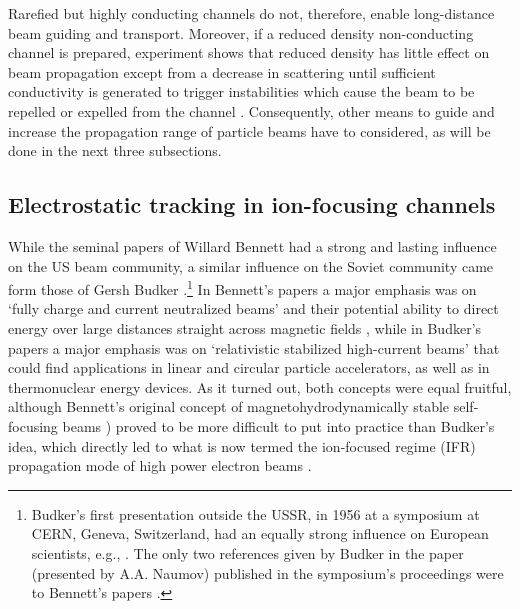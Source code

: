 \documentclass [12pt,a4paper,     ]{report} %
\begin{document}
   Rarefied but highly conducting channels do not, therefore, enable long-distance beam guiding and transport.  Moreover, if a reduced density non-conducting channel is prepared, experiment shows that reduced density has little effect on beam propagation except from a decrease in scattering until sufficient conductivity is generated to trigger instabilities which cause the beam to be repelled or expelled from the channel \cite{MURPH1987-}.  Consequently, other means to guide and increase the propagation range of particle beams have to considered, as will be done in the next three subsections.


\subsection{Electrostatic tracking in ion-focusing channels}

  While the seminal papers of Willard Bennett \cite{BENNE1934-,BENNE1955-} had a strong and lasting influence on the US beam community, a similar influence on the Soviet community came form those of Gersh Budker \cite{BUDKE1956A, BUDKE1956B}.\footnote{Budker's first presentation outside the USSR, in 1956 at a symposium at CERN, Geneva, Switzerland, had an equally strong influence on European scientists, e.g., \cite{LAWSO1958-,  LINHA1959-, FINKE1961-}. The only two references given by Budker in the paper (presented by A.A. Naumov) published in the symposium's proceedings \cite{BUDKE1956A} were to Bennett's papers \cite{BENNE1934-,BENNE1955-}.}  In Bennett's papers a major emphasis was on `fully charge and current neutralized beams' and their potential ability to direct energy over large distances straight across magnetic fields \cite{GUENT1980-}, while in Budker's papers a major emphasis was on `relativistic stabilized high-current beams' that could find applications in linear and circular particle accelerators, as well as in thermonuclear energy devices.  As it turned out, both concepts were equal fruitful, although Bennett's original concept of magnetohydrodynamically stable self-focusing beams \cite{BENNE1955-}) proved to be more difficult to put into practice than Budker's idea, which directly led to what is now termed the ion-focused regime (IFR) propagation mode of high power electron beams \cite{BRIGG1981-, BUCHA1987-, SWANE1993-}.
\end{document}
